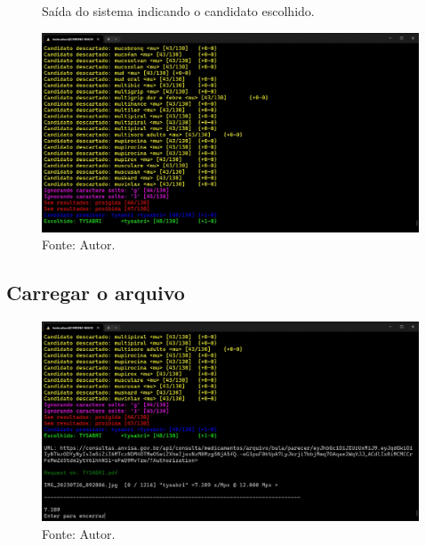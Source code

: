 \begin{frame}
	\begin{figure}
		\centering
		\caption*{Saída do sistema indicando o candidato escolhido.}
		\includegraphics[height=0.72\textheight]{../pictures/terminal tysabri escolhido 2.jpg}
		\caption*{Fonte: Autor.}
	\end{figure}
\end{frame}

\subsection{Carregar o arquivo}
\begin{frame}
    \begin{figure}
        \centering
        \caption*{Saída do sistema indicando arquivo \lstinline|TYSABRI.pdf| carregado.}
        \includegraphics[height=0.72\textheight]{../pictures/terminal tysabri carregado.jpg}
        \caption*{Fonte: Autor.}
    \end{figure}
\end{frame}

